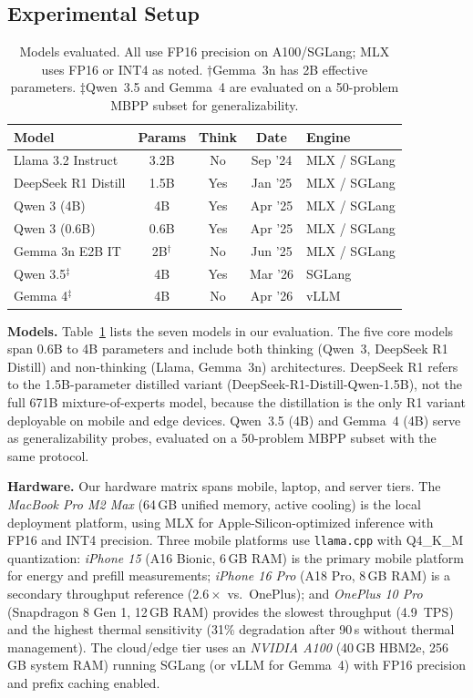 \documentclass[sigconf,anonymous,review]{acmart}
\begin{document}
\subsection{Experimental Setup}
\label{sec:setup}

\begin{table}[t]
\centering
\caption{Models evaluated. All use FP16 precision on A100/SGLang; MLX uses FP16 or INT4 as noted. $\dagger$Gemma~3n has 2B effective parameters. $\ddagger$Qwen~3.5 and Gemma~4 are evaluated on a 50-problem MBPP subset for generalizability.}
\label{tab:models}
\small
\setlength{\tabcolsep}{4pt}
\begin{tabular}{@{} l c c c l @{}}
\toprule
\textbf{Model} & \textbf{Params} & \textbf{Think} & \textbf{Date} & \textbf{Engine} \\
\midrule
Llama 3.2 Instruct & 3.2B     & No  & Sep '24 & MLX / SGLang \\
DeepSeek R1 Distill & 1.5B    & Yes & Jan '25 & MLX / SGLang \\
Qwen 3 (4B)      & 4B         & Yes & Apr '25 & MLX / SGLang \\
Qwen 3 (0.6B)    & 0.6B       & Yes & Apr '25 & MLX / SGLang \\
Gemma 3n E2B IT   & 2B$^\dagger$ & No  & Jun '25 & MLX / SGLang \\
Qwen 3.5$^\ddagger$ & 4B      & Yes & Mar '26 & SGLang \\
Gemma 4$^\ddagger$  & 4B      & No  & Apr '26 & vLLM \\
\bottomrule
\end{tabular}
\end{table}

\noindent\textbf{Models.} Table~\ref{tab:models} lists the seven models in our evaluation. The five core models span 0.6B to 4B parameters and include both thinking (Qwen~3, DeepSeek R1 Distill) and non-thinking (Llama, Gemma~3n) architectures. DeepSeek R1 refers to the 1.5B-parameter distilled variant (DeepSeek-R1-Distill-Qwen-1.5B), not the full 671B mixture-of-experts model, because the distillation is the only R1 variant deployable on mobile and edge devices. Qwen~3.5 (4B) and Gemma~4 (4B) serve as generalizability probes, evaluated on a 50-problem MBPP subset with the same protocol.

\noindent\textbf{Hardware.} Our hardware matrix spans mobile, laptop, and server tiers. The \textit{MacBook Pro M2 Max} (64\,GB unified memory, active cooling) is the local deployment platform, using MLX for Apple-Silicon-optimized inference with FP16 and INT4 precision. Three mobile platforms use \texttt{llama.cpp} with Q4\_K\_M quantization: \textit{iPhone 15} (A16 Bionic, 6\,GB RAM) is the primary mobile platform for energy and prefill measurements; \textit{iPhone 16 Pro} (A18 Pro, 8\,GB RAM) is a secondary throughput reference ($2.6\times$ vs.\ OnePlus); and \textit{OnePlus 10 Pro} (Snapdragon 8 Gen 1, 12\,GB RAM) provides the slowest throughput (4.9~TPS) and the highest thermal sensitivity (31\% degradation after 90\,s without thermal management). The cloud/edge tier uses an \textit{NVIDIA A100} (40\,GB HBM2e, 256\,GB system RAM) running SGLang (or vLLM for Gemma~4) with FP16 precision and prefix caching enabled.
\end{document}
